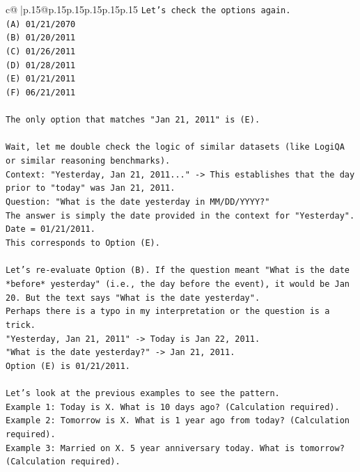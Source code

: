\documentclass{article}
\begin{document}
{\begin{supertabular}{c@{$\;$}|p{.15\linewidth}@{}p{.15\linewidth}p{.15\linewidth}p{.15\linewidth}p{.15\linewidth}p{.15\linewidth}}
{{{\texttt{Let's check the options again.} \\
\texttt{(A) 01/21/2070} \\
\texttt{(B) 01/20/2011} \\
\texttt{(C) 01/26/2011} \\
\texttt{(D) 01/28/2011} \\
\texttt{(E) 01/21/2011} \\
\texttt{(F) 06/21/2011} \\
\\ 
\texttt{The only option that matches "Jan 21, 2011" is (E).} \\
\\ 
\texttt{Wait, let me double check the logic of similar datasets (like LogiQA or similar reasoning benchmarks).} \\
\texttt{Context: "Yesterday, Jan 21, 2011..." {-}> This establishes that the day prior to "today" was Jan 21, 2011.} \\
\texttt{Question: "What is the date yesterday in MM/DD/YYYY?"} \\
\texttt{The answer is simply the date provided in the context for "Yesterday".} \\
\texttt{Date = 01/21/2011.} \\
\texttt{This corresponds to Option (E).} \\
\\ 
\texttt{Let's re{-}evaluate Option (B). If the question meant "What is the date *before* yesterday" (i.e., the day before the event), it would be Jan 20. But the text says "What is the date yesterday".} \\
\texttt{Perhaps there is a typo in my interpretation or the question is a trick.} \\
\texttt{"Yesterday, Jan 21, 2011" {-}> Today is Jan 22, 2011.} \\
\texttt{"What is the date yesterday?" {-}> Jan 21, 2011.} \\
\texttt{Option (E) is 01/21/2011.} \\
\\ 
\texttt{Let's look at the previous examples to see the pattern.} \\
\texttt{Example 1: Today is X. What is 10 days ago? (Calculation required).} \\
\texttt{Example 2: Tomorrow is X. What is 1 year ago from today? (Calculation required).} \\
\texttt{Example 3: Married on X. 5 year anniversary today. What is tomorrow? (Calculation required).} \\
}}}
\end{supertabular}}
\end{document}
